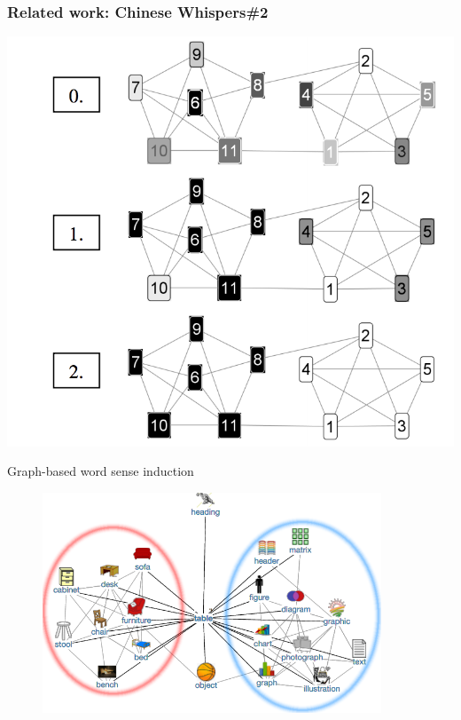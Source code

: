 \documentclass[usenames,dvipsnames]{beamer}
\begin{document}
\begin{frame}[fragile]
\frametitle{Related work: Chinese Whispers\#2}
\begin{center}
 \includegraphics[height=0.59\textwidth]{figures/cw2}
 
 \end{center}
\end{frame}


\begin{frame}{Graph-based word sense induction}


	
\centering
\begin{figure}
\includegraphics[width=0.9\textwidth]{figures/table}
\end{figure}

\end{frame}
\end{document}
